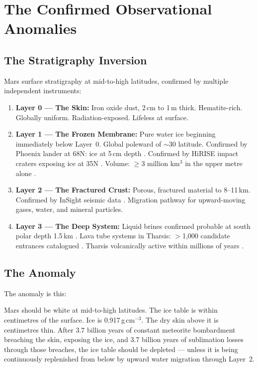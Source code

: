 \documentclass[11pt, a4paper]{article}
\begin{document}
\section{The Confirmed Observational Anomalies}

\subsection{The Stratigraphy Inversion}

Mars surface stratigraphy at mid-to-high
latitudes, confirmed by multiple independent
instruments:

\begin{enumerate}[leftmargin=*, label=(\arabic*)]
\item \textbf{Layer 0 --- The Skin:}
  Iron oxide dust, 2\,cm to 1\,m thick.
  Hematite-rich. Globally uniform.
  Radiation-exposed. Lifeless at surface.

\item \textbf{Layer 1 --- The Frozen Membrane:}
  Pure water ice beginning immediately
  below Layer~0. Global poleward of
  $\sim$30\textdegree{} latitude.
  Confirmed by Phoenix lander at 68\textdegree{}N:
  ice at 5\,cm depth \cite{phoenix2009}.
  Confirmed by HiRISE impact craters exposing
  ice at 35\textdegree{}N \cite{hirise2021}.
  Volume: $\geq$3 million km$^3$ in the upper
  metre alone \cite{odyssey2002}.

\item \textbf{Layer 2 --- The Fractured Crust:}
  Porous, fractured material to 8--11\,km.
  Confirmed by InSight seismic data
  \cite{insight2021}.
  Migration pathway for upward-moving gases,
  water, and mineral particles.

\item \textbf{Layer 3 --- The Deep System:}
  Liquid brines confirmed probable at south
  polar depth 1.5\,km \cite{orosei2018}.
  Lava tube systems in Tharsis: $>$1,000
  candidate entrances catalogued
  \cite{mgc3catalog}.
  Tharsis volcanically active within
  millions of years \cite{tharsis2023}.
\end{enumerate}

\subsection{The Anomaly}

The anomaly is this:

Mars should be white at mid-to-high latitudes.
The ice table is within centimetres of the
surface. Ice is 0.917\,g\,cm$^{-3}$. The dry
skin above it is centimetres thin. After 3.7
billion years of constant meteorite
bombardment breaching the skin, exposing the
ice, and 3.7 billion years of sublimation
losses through those breaches, the ice table
should be depleted --- unless it is being
continuously replenished from below by upward
water migration through Layer~2.
\end{document}
